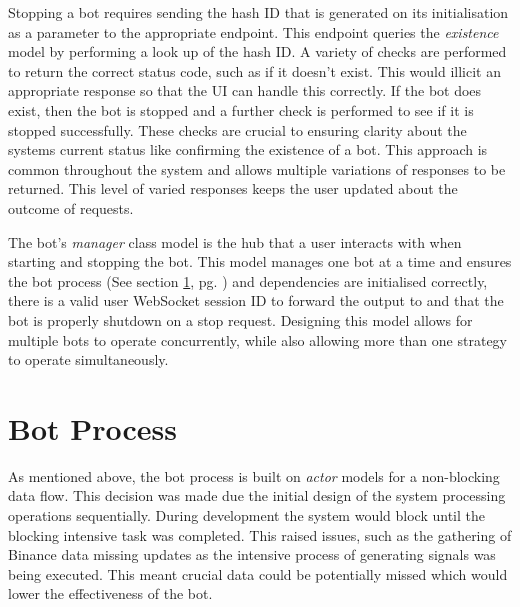 Stopping a bot requires sending the hash ID that is generated on its initialisation as a parameter to the appropriate endpoint. This endpoint queries the \textit{existence} model by performing a look up of the hash ID. A variety of checks are performed to return the correct status code, such as if it doesn't exist.  This would illicit an appropriate response so that the UI can handle this correctly. If the bot does exist, then the bot is stopped and a further check is performed to see if it is stopped successfully. These checks are crucial to ensuring clarity about the systems current status like confirming the existence of a bot. This approach is common throughout the system and allows multiple variations of responses to be returned. This level of varied responses keeps the user updated about the outcome of requests.

The bot's \textit{manager} class model is the hub that a user interacts with when starting and stopping the bot. This model manages one bot at a time and ensures the bot process (See section \ref{sec:implementation:bot}, pg. \pageref{sec:implementation:bot}) and dependencies are initialised correctly, there is a valid user WebSocket session ID to forward the output to and that the bot is properly shutdown on a stop request. Designing this model allows for multiple bots to operate concurrently, while also allowing more than one strategy to operate simultaneously.


\section{Bot Process}
\label{sec:implementation:bot}

\noindent As mentioned above, the bot process is built on \textit{actor} models for a non-blocking data flow. This decision was made due the initial design of the system processing operations sequentially. During development the system would block until the blocking intensive task was completed. This raised issues, such as the gathering of Binance data missing updates as the intensive process of generating signals was being executed. This meant crucial data could be potentially missed which would lower the effectiveness of the bot.

